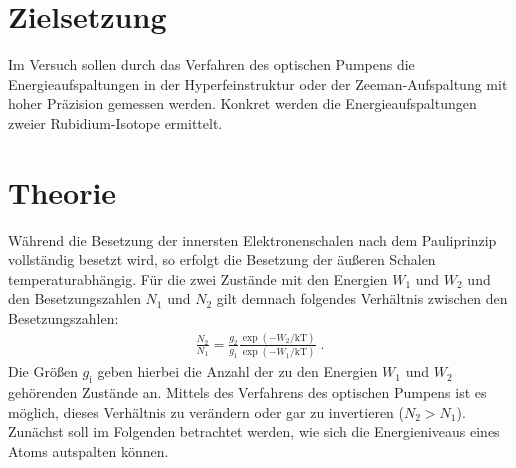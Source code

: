 \section{Zielsetzung}
Im Versuch sollen durch das Verfahren des optischen Pumpens die Energieaufspaltungen
in der Hyperfeinstruktur oder der Zeeman-Aufspaltung mit hoher Präzision gemessen werden.
Konkret werden die Energieaufspaltungen zweier Rubidium-Isotope ermittelt.

\section{Theorie}
Während die Besetzung der innersten Elektronenschalen nach dem Pauliprinzip vollständig besetzt
wird, so erfolgt die Besetzung der äußeren Schalen temperaturabhängig.
Für die zwei Zustände mit den Energien $W_1$ und $W_2$ und den Besetzungszahlen $N_1$ und
$N_2$ gilt demnach folgendes Verhältnis zwischen den Besetzungszahlen:
\begin{align*}
    \frac{N_{2}}{N_{1}} = \frac{g_{2}}{g_{1}}\frac{\exp(-W_{2}/\text{kT})}{\exp(-W_{1}/\text{kT})} \; .
\end{align*}
Die Größen $g_{\text{i}}$ geben hierbei die Anzahl der zu den Energien $W_1$ und $W_2$ gehörenden
Zustände an.
Mittels des Verfahrens des optischen Pumpens ist es möglich, dieses Verhältnis zu verändern
oder gar zu invertieren ($N_{2} > N_{1}$).
Zunächst soll im Folgenden betrachtet werden, wie sich die Energieniveaus eines Atoms autspalten können.

